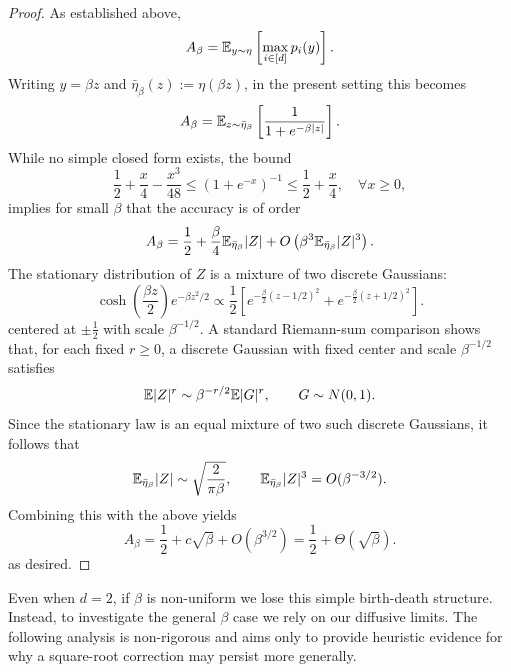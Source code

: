 \begin{proof}
    As established above,
    \[A_\beta = \mathbb{E}_{y \sim \eta} \left[\max_{i\in[d]} p_i(y)\right].\]
    \noindent Writing $y=\beta z$ and $\bar\eta_\beta(z):=\eta(\beta z)$, in the present setting this becomes
    \[A_\beta=\mathbb{E}_{z \sim \bar\eta_\beta}\left[ \frac{1}{1+e^{-\beta |z|}} \right].\]
    \noindent While no simple closed form exists, the bound
    \[\frac{1}{2} +\frac{x}{4}-\frac{x^3}{48} \leq (1 + e^{-x})^{-1} \leq \frac{1}{2} +\frac{x}{4}, \quad \forall x \geq 0,\]
    \noindent implies for small $\beta$ that the accuracy is of order
    \[A_\beta = \frac{1}{2} + \frac{\beta}{4} \mathbb{E}_{\bar\eta_\beta} |Z| + O\left(\beta^3 \mathbb{E}_{\bar\eta_\beta} |Z|^3\right).\]
    \noindent The stationary distribution of $Z$ is a mixture of two discrete Gaussians:
    \[\cosh\left(\frac{\beta z}{2} \right) e^{-\beta z^2/2} \propto \frac{1}{2} \left[e^{-\frac{\beta}{2}(z-1/2)^2} + e^{-\frac{\beta}{2}(z+1/2)^2} \right].\]
    \noindent centered at $\pm \frac{1}{2}$ with scale $\beta^{-1/2}$. A standard Riemann-sum comparison shows that, for each fixed $r\geq 0$, a discrete Gaussian with fixed center and scale $\beta^{-1/2}$ satisfies
    \[\mathbb{E} |Z|^r \sim \beta^{-r/2}\mathbb{E}|G|^r, \qquad G\sim N(0,1).\]
    Since the stationary law is an equal mixture of two such discrete Gaussians, it follows that
    \[\mathbb{E}_{\bar\eta_\beta} |Z| \sim \sqrt{\frac{2}{\pi\beta}}, \qquad \mathbb{E}_{\bar\eta_\beta} |Z|^3 = O(\beta^{-3/2}).\]
    \noindent Combining this with the above yields
    \[A_\beta = \frac{1}{2} + c \sqrt{\beta} + O(\beta^{3/2}) = \frac{1}{2} + \Theta(\sqrt{\beta}).\]
    \noindent as desired.
 \end{proof}

\noindent Even when $d=2$, if $\beta$ is non-uniform we lose this simple birth-death structure. Instead, to investigate the general $\beta$ case we rely on our diffusive limits. The following analysis is non-rigorous and aims only to provide heuristic evidence for why a square-root correction may persist more generally.

